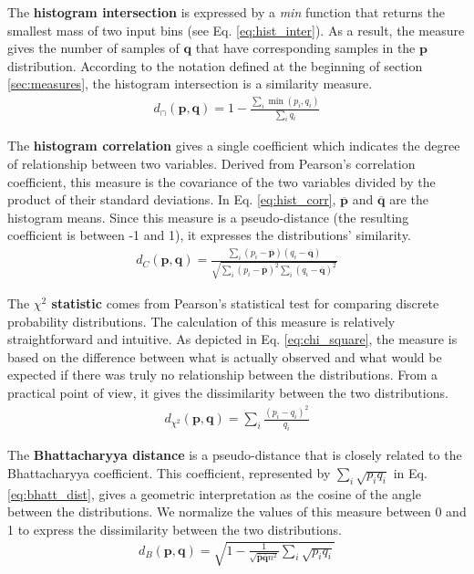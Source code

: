 The \textbf{histogram intersection} \citep{Swain.Ballard:IJCV:1991} is expressed by a \textit{min} function that returns the smallest mass of two input bins (see Eq. \eqref{eq:hist_inter}). As a result, the measure gives the number of samples of $\mathbf{q}$ that have corresponding samples in the $\mathbf{p}$ distribution. According to the notation defined at the beginning of section \ref{sec:measures}, the histogram intersection is a similarity measure.
\begin{eqnarray}
d_{\cap}(\mathbf{p}, \mathbf{q}) = 1 - \frac{\sum_{i}\min(p_i, q_i)}{\sum_{i}q_i} \label{eq:hist_inter}
\end{eqnarray}

The \textbf{histogram correlation} gives a single coefficient which indicates the degree of relationship between two variables. Derived from Pearson's correlation coefficient, this measure is the covariance of the two variables divided by the product of their standard deviations. In Eq. \eqref{eq:hist_corr}, $\overline{\mathbf{p}}$ and $\overline{\mathbf{q}}$ are the histogram means. Since this measure is a pseudo-distance (the resulting coefficient is between -1 and 1), it expresses the distributions' similarity.  
\begin{eqnarray}
d_{C}(\mathbf{p}, \mathbf{q}) = \frac{\sum_{i}(p_i - \overline{\mathbf{p}})(q_i - \overline{\mathbf{q}})}{\sqrt{\sum_{i}(p_i - \overline{\mathbf{p}})^{2}\sum_{i}(q_i - \overline{\mathbf{q}})^{2}}} \label{eq:hist_corr}
\end{eqnarray}

The \textbf{$\chi^2$ statistic} comes from Pearson's statistical test for comparing discrete probability distributions. The calculation of this measure is relatively straightforward and intuitive. As depicted in Eq. \eqref{eq:chi_square}, the measure is based on the difference between what is actually observed and what would be expected if there was truly no relationship between the distributions. From a practical point of view, it gives the dissimilarity between the two distributions.
\begin{eqnarray}
d_{\chi^2}(\mathbf{p},\mathbf{q}) = \sum\nolimits_i \frac{(p_i - q_i)^2}{q_i} \label{eq:chi_square}
\end{eqnarray}


The \textbf{Bhattacharyya distance} \citep{Bhattacharyya:IJS:1946} is a pseudo-distance that is closely related to the Bhattacharyya coefficient. This coefficient, represented by $\sum_i\sqrt{p_{i}q_{i}}$ in Eq. \eqref{eq:bhatt_dist}, gives a geometric interpretation as the cosine of the angle between the distributions. We normalize the values of this measure between 0 and 1 to express the dissimilarity between the two distributions.
\begin{eqnarray}
d_{B}(\mathbf{p}, \mathbf{q}) = \sqrt{1- \frac{1}{\sqrt{\overline{\mathbf{p}} \overline{\mathbf{q}} n^2}} \sum\nolimits_{i} \sqrt{p_i q_i}} \label{eq:bhatt_dist}
\end{eqnarray}

